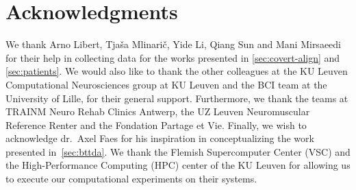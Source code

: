 \chapter*{Acknowledgments}
We thank Arno Libert,
Tjaša Mlinarič, Yide Li, Qiang Sun and Mani Mirsaeedi for their help in collecting data
for the works presented in \cref{sec:covert-align} and
\cref{sec:patients}.
We would also like to thank the other colleagues at the KU Leuven Computational
Neurosciences group at KU Leuven and the BCI team at the University of Lille,
for their general support.
Furthermore, we thank the teams at TRAINM Neuro Rehab Clinics Antwerp,
the UZ Leuven Neuromuscular Reference Renter and the Fondation Partage et Vie.
Finally, we wish to acknowledge dr.\ Axel Faes for his inspiration in conceptualizing
the work presented in~\cref{sec:bttda}.
We thank the Flemish Supercomputer Center (VSC) and the High-Performance
Computing (HPC) center of the KU Leuven for allowing us to execute our
computational experiments on their systems.
